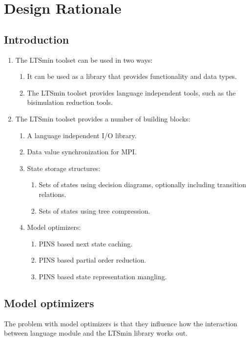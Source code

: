 
\chapter{Design Rationale}

\section{Introduction}

\begin{enumerate}
\item The LTSmin toolset can be used in two ways:
\begin{enumerate}
\item It can be used as a library that provides functionality and data types.
\item The LTSmin toolset provides language independent tools, such as the bisimulation reduction tools.
\end{enumerate}
\item The LTSmin toolset provides a number of building blocks:
\begin{enumerate}
\item A language independent I/O library.
\item Data value synchronization for MPI.
\item State storage structures:
\begin{enumerate}
\item Sets of states using decision diagrams, optionally including transition relations.
\item Sets of states using tree compression.
\end{enumerate}
\item Model optimizers:
\begin{enumerate}
\item PINS based next state caching.
\item PINS based partial order reduction.
\item PINS based state representation mangling.
\end{enumerate}
\end{enumerate}
\end{enumerate}


\section{Model optimizers}

The problem with model optimizers is that they influence how the interaction
between language module and the LTSmin library works out.

